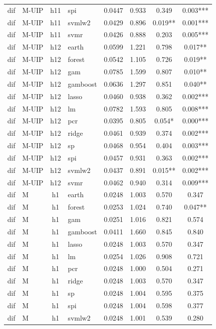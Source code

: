 \begin{ThreePartTable}
\begin{longtable}[t]{llclcccc}
dif & M-UIP & h11 & spi & 0.0447 & 0.933 & 0.349 & 0.003***\\
dif & M-UIP & h11 & svmlw2 & 0.0429 & 0.896 & 0.019** & 0.001***\\
dif & M-UIP & h11 & svmr & 0.0426 & 0.888 & 0.203 & 0.005***\\
\addlinespace
dif & M-UIP & h12 & earth & 0.0599 & 1.221 & 0.798 & 0.017**\\
dif & M-UIP & h12 & forest & 0.0542 & 1.105 & 0.726 & 0.019**\\
dif & M-UIP & h12 & gam & 0.0785 & 1.599 & 0.807 & 0.010**\\
dif & M-UIP & h12 & gamboost & 0.0636 & 1.297 & 0.851 & 0.040**\\
dif & M-UIP & h12 & lasso & 0.0460 & 0.938 & 0.362 & 0.002***\\
dif & M-UIP & h12 & lm & 0.0782 & 1.593 & 0.805 & 0.008***\\
dif & M-UIP & h12 & pcr & 0.0395 & 0.805 & 0.054* & 0.000***\\
dif & M-UIP & h12 & ridge & 0.0461 & 0.939 & 0.374 & 0.002***\\
dif & M-UIP & h12 & sp & 0.0468 & 0.954 & 0.404 & 0.003***\\
dif & M-UIP & h12 & spi & 0.0457 & 0.931 & 0.363 & 0.002***\\
dif & M-UIP & h12 & svmlw2 & 0.0437 & 0.891 & 0.015** & 0.002***\\
dif & M-UIP & h12 & svmr & 0.0462 & 0.940 & 0.314 & 0.009***\\
\addlinespace
dif & M & h1 & earth & 0.0248 & 1.003 & 0.570 & 0.347\\
dif & M & h1 & forest & 0.0253 & 1.024 & 0.740 & 0.047**\\
dif & M & h1 & gam & 0.0251 & 1.016 & 0.821 & 0.574\\
dif & M & h1 & gamboost & 0.0411 & 1.660 & 0.845 & 0.840\\
dif & M & h1 & lasso & 0.0248 & 1.003 & 0.570 & 0.347\\
dif & M & h1 & lm & 0.0254 & 1.026 & 0.908 & 0.721\\
dif & M & h1 & pcr & 0.0248 & 1.000 & 0.504 & 0.271\\
dif & M & h1 & ridge & 0.0248 & 1.003 & 0.570 & 0.347\\
dif & M & h1 & sp & 0.0248 & 1.004 & 0.595 & 0.375\\
dif & M & h1 & spi & 0.0248 & 1.004 & 0.598 & 0.377\\
dif & M & h1 & svmlw2 & 0.0248 & 1.001 & 0.539 & 0.280\\

\end{longtable}
\end{ThreePartTable}
